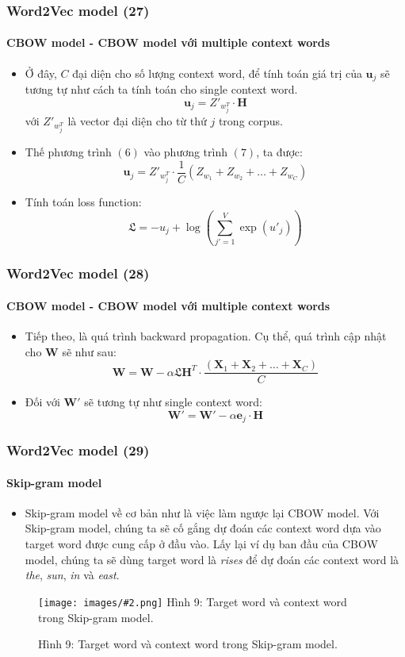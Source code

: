 \documentclass[aspectratio=169]{beamer}
\newcommand{\includeImage}[3]{
\begin{figure}[H]
    \centering
    \texttt{[image: images/\#2.png]}
    \def\temp{#3}\ifx\temp\empty\else\caption{#3}\fi
\end{figure}}
\newcommand{\twiceIndent}{\hspace{\parindent}}
\begin{document}
\begin{frame}
    \frametitle{Word2Vec model (27)}
    \framesubtitle{CBOW model - CBOW model với multiple context words}
    \begin{itemize}
        \item Ở đây, $C$ đại diện cho số lượng context word, để tính toán giá trị của $\boldsymbol{u}_j$ sẽ tương tự như cách ta tính toán cho single context word.
        \[\boldsymbol{u}_j = Z'_{w_j^T} \cdot \boldsymbol{H} \tag{7}\]
        \twiceIndent với $Z'_{w_j^T}$ là vector đại diện cho từ thứ $j$ trong corpus.
        \item Thế phương trình $(6)$ vào phương trình $(7)$, ta được:
        $$\boldsymbol{u}_j = Z'_{w_j^T} \cdot \dfrac{1}{C} (Z_{w_1} + Z_{w_2} + \hdots + Z_{w_C})$$
        \item Tính toán loss function:
        $$\mathfrak{L} = -u_j + \log{\left ( \sum_{j'=1}^V \exp{(u'_j)} \right )}$$
    \end{itemize}
\end{frame}

\begin{frame}
    \frametitle{Word2Vec model (28)}
    \framesubtitle{CBOW model - CBOW model với multiple context words}
    \begin{itemize}
        \item Tiếp theo, là quá trình backward propagation. Cụ thể, quá trình cập nhật cho $\boldsymbol{W}$ sẽ như sau:
        $$\boldsymbol{W} = \boldsymbol{W} - \alpha \mathfrak{L} \boldsymbol{H}^T \cdot \dfrac{(\boldsymbol{X}_1 + \boldsymbol{X}_2 + \hdots + \boldsymbol{X}_C)}{C}$$
        \item Đối với $\boldsymbol{W'}$ sẽ tương tự như single context word:
        $$\boldsymbol{W'} = \boldsymbol{W'} - \alpha \boldsymbol{e}_j \cdot \boldsymbol{H}$$
    \end{itemize}
\end{frame}

\begin{frame}
    \frametitle{Word2Vec model (29)}
    \framesubtitle{Skip-gram model}
    \begin{itemize}
        \item Skip-gram model về cơ bản như là việc làm ngược lại CBOW model. Với Skip-gram model, chúng ta sẽ cố gắng dự đoán các context word dựa vào target word được cung cấp ở đầu vào. Lấy lại ví dụ ban đầu của CBOW model, chúng ta sẽ dùng target word là \textsl{rises} để dự đoán các context word là \textsl{the}, \textsl{sun}, \textsl{in} và \textsl{east}.
    \end{itemize}
    \includeImage{0.73}{04}{Hình 9: Target word và context word trong Skip-gram model.}
\end{frame}
\end{document}
